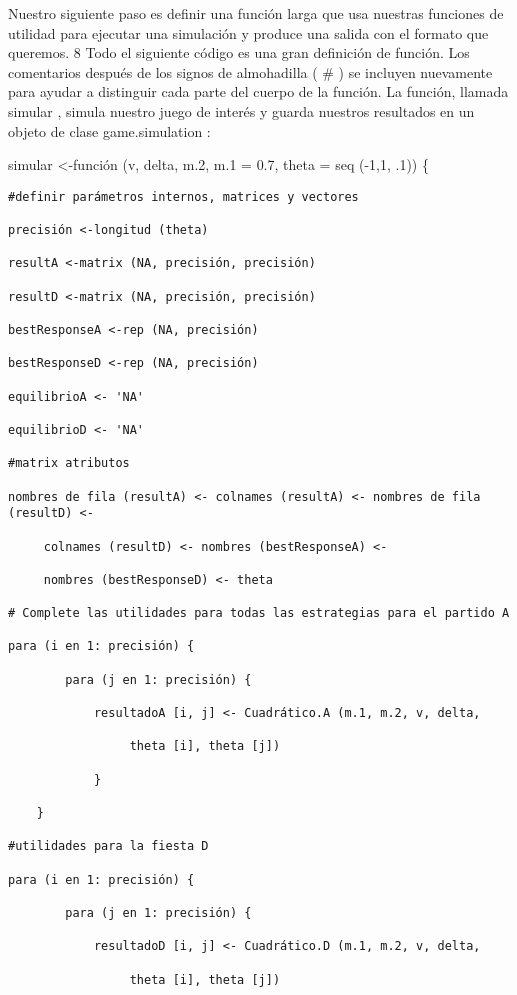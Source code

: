 \documentclass[
]{book}
\begin{document}
Nuestro siguiente paso es definir una función larga que usa nuestras funciones de utilidad para ejecutar una simulación y produce una salida con el formato que queremos. 8 Todo el siguiente código es una gran definición de función. Los comentarios después de los signos de almohadilla ( \# ) se incluyen nuevamente para ayudar a distinguir cada parte del cuerpo de la función. La función, llamada simular , simula nuestro juego de interés y guarda nuestros resultados en un objeto de clase game.simulation :

simular \textless-función (v, delta, m.2, m.1 = 0.7, theta = seq (-1,1, .1)) \{

\begin{verbatim}
#definir parámetros internos, matrices y vectores

precisión <-longitud (theta)

resultA <-matrix (NA, precisión, precisión)

resultD <-matrix (NA, precisión, precisión)

bestResponseA <-rep (NA, precisión)

bestResponseD <-rep (NA, precisión)

equilibrioA <- 'NA'

equilibrioD <- 'NA'

#matrix atributos

nombres de fila (resultA) <- colnames (resultA) <- nombres de fila (resultD) <-

     colnames (resultD) <- nombres (bestResponseA) <-

     nombres (bestResponseD) <- theta

# Complete las utilidades para todas las estrategias para el partido A

para (i en 1: precisión) {

        para (j en 1: precisión) {

            resultadoA [i, j] <- Cuadrático.A (m.1, m.2, v, delta,

                 theta [i], theta [j])

            }

    }

#utilidades para la fiesta D

para (i en 1: precisión) {

        para (j en 1: precisión) {

            resultadoD [i, j] <- Cuadrático.D (m.1, m.2, v, delta,

                 theta [i], theta [j])


\end{verbatim}
\end{document}
